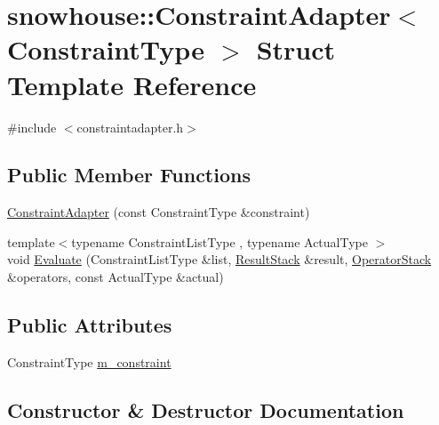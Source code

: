 \hypertarget{structsnowhouse_1_1ConstraintAdapter}{}\section{snowhouse\+::Constraint\+Adapter$<$ Constraint\+Type $>$ Struct Template Reference}
\label{structsnowhouse_1_1ConstraintAdapter}


{\ttfamily \#include $<$constraintadapter.\+h$>$}

\subsection*{Public Member Functions}
\begin{DoxyCompactItemize}
\item 
\mbox{\hyperlink{structsnowhouse_1_1ConstraintAdapter_a2c3d376e022e068068aeadef70957d05}{Constraint\+Adapter}} (const Constraint\+Type \&constraint)
\item 
{\footnotesize template$<$typename Constraint\+List\+Type , typename Actual\+Type $>$ }\\void \mbox{\hyperlink{structsnowhouse_1_1ConstraintAdapter_a42a6d2b5c783e174f8636440964be9f7}{Evaluate}} (Constraint\+List\+Type \&list, \mbox{\hyperlink{namespacesnowhouse_a719169b1315a13161c15f25e600a8f51}{Result\+Stack}} \&result, \mbox{\hyperlink{namespacesnowhouse_adcb10e215e6a4bbcb35722a9c7270fc6}{Operator\+Stack}} \&operators, const Actual\+Type \&actual)
\end{DoxyCompactItemize}
\subsection*{Public Attributes}
\begin{DoxyCompactItemize}
\item 
Constraint\+Type \mbox{\hyperlink{structsnowhouse_1_1ConstraintAdapter_a72840068bf7c504838afb90c842248ba}{m\+\_\+constraint}}
\end{DoxyCompactItemize}


\subsection{Constructor \& Destructor Documentation}
\mbox{\label{structsnowhouse_1_1ConstraintAdapter_a2c3d376e022e068068aeadef70957d05}} 
